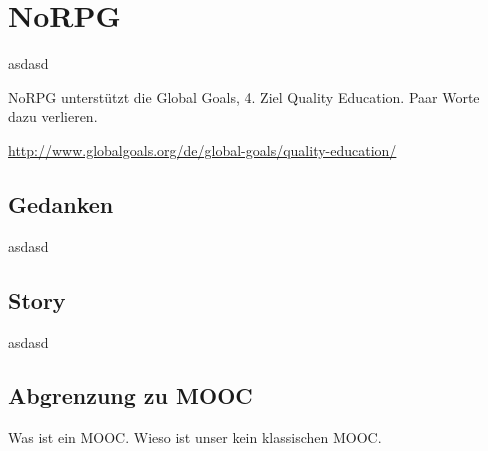 \chapter{NoRPG}
	asdasd
	
	NoRPG unterstützt die Global Goals, 4. Ziel Quality Education. Paar Worte dazu verlieren. 
	
	\url{http://www.globalgoals.org/de/global-goals/quality-education/}

	
\section{Gedanken}
	asdasd
	
\section{Story}
	asdasd
	
\section{Abgrenzung zu MOOC}
	Was ist ein MOOC. Wieso ist unser kein klassischen MOOC.
